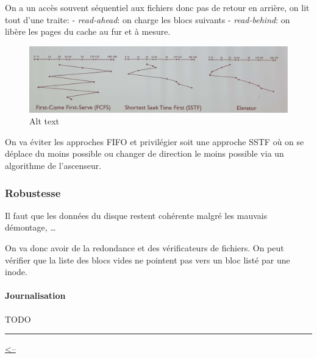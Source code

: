 On a un accès souvent séquentiel aux fichiers donc pas de retour en
arrière, on lit tout d'une traite: - \emph{read-ahead}: on charge les
blocs suivants - \emph{read-behind}: on libère les pages du cache au fur
et à mesure.

\begin{figure}
\centering
\includegraphics{Drawboard-PDF-Annotation-Copy.png}
\caption{Alt text}
\end{figure}

On va éviter les approches FIFO et privilégier soit une approche SSTF où
on se déplace du moins possible ou changer de direction le moins
possible via un algorithme de l'ascenseur.

\subsubsection{Robustesse}\label{robustesse}

Il faut que les données du disque restent cohérente malgré les mauvais
démontage, \ldots{}

On va donc avoir de la redondance et des vérificateurs de fichiers. On
peut vérifier que la liste des blocs vides ne pointent pas vers un bloc
listé par une inode.

\paragraph{Journalisation}\label{journalisation}

TODO

\begin{center}\rule{0.5\linewidth}{0.5pt}\end{center}

\href{../README.md}{\textless--}
